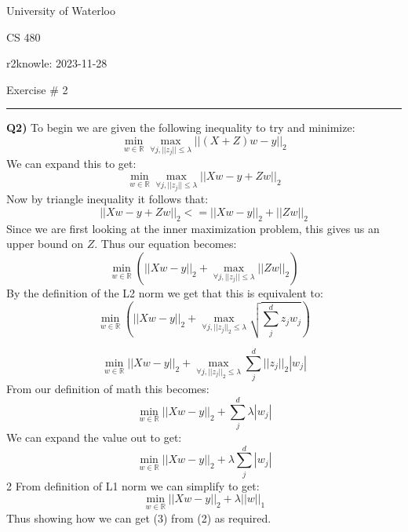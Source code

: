 \documentclass{article}
\begin{document}
\begin{titlepage}
	\setlength{\parindent}{0pt}
	\large

\vspace*{-2cm}



University of Waterloo \par
CS 480 \par
\vspace{0.05cm}
r2knowle: 2023-11-28
\vspace{0.2cm}

{\huge Exercise \# 2 \par}
\hrule

\vspace{0.5cm}
\textbf{Q2)} To begin we are given the following inequality to try and minimize:
\[ \min_{w \in \mathbb{R}} \max_{\forall j, ||z_j|| \leq \lambda} ||(X+Z)w - y ||_2 \]
We can expand this to get:
\[ \min_{w \in \mathbb{R}} \max_{\forall j, ||z_j|| \leq \lambda} ||Xw - y + Zw ||_2 \]
Now by triangle inequality it follows that:
\[ ||Xw - y + Zw ||_2 <=  ||Xw - y ||_2 + ||Zw ||_2 \]
Since we are first looking at the inner maximization problem, this gives us an upper bound on $Z$. Thus our equation becomes:
\[\min_{w \in \mathbb{R}} \left( ||Xw - y ||_2 + \max_{\forall j, ||z_j|| \leq \lambda} ||Zw ||_2  \right) \]
By the definition of the L2 norm we get that this is equivalent to:
\[\min_{w \in \mathbb{R}} \left( ||Xw - y ||_2 + \max_{\forall j, ||z_j||_2 \leq \lambda} \sqrt{\sum_j^d{z_jw_j}} \right) \]

\[\min_{w \in \mathbb{R}} ||Xw - y ||_2 +  \max_{\forall j, ||z_j||_2 \leq \lambda} \sum_j^d ||z_j||_2|w_j| \]
From our definition of math this becomes:
\[\min_{w \in \mathbb{R}} ||Xw - y ||_2 +  \sum_j^d \lambda|w_j| \]
We can expand the value out to get:
\[\min_{w \in \mathbb{R}} ||Xw - y ||_2 +  \lambda\sum_j^d |w_j| \]2
From definition of L1 norm we can simplify to get:
\[\min_{w \in \mathbb{R}} ||Xw - y ||_2 +  \lambda||w||_1 \]
Thus showing how we can get (3) from (2) as required.
\end{titlepage}
\end{document}
